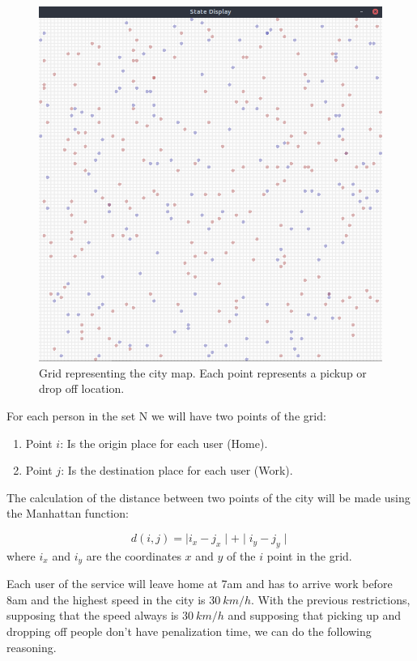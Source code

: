 \documentclass[12]{article}
\begin{document}
\begin{figure}[H]
\centering
\includegraphics[scale=0.35]{images/grid.png}
\captionsetup{justification=centering}
\caption{Grid representing the city map. Each point represents a pickup or drop off location.}
\label{grid}
\end{figure}

For each person in the set N we will have two points of the grid:

\begin{enumerate}
  \item Point $i$: Is the origin place for each user (Home).
  \item Point $j$: Is the destination place for each user (Work). 
\end{enumerate}

The calculation of the distance between two points of the city will be made using the Manhattan function: 

$$ d(i,j) = \mid i_x - j_x\mid+ \mid i_y - j_y\mid $$
where $i_x$ and $i_y$ are the coordinates $x$ and $y$ of the $i$ point in the grid. 

Each user of the service will leave home at 7am and has to arrive work before 8am and the highest speed in the city is $30\ km/h$.
With the previous restrictions, supposing that the speed always is $30\ km/h$ and supposing that picking up and dropping off people don't have penalization time, we can do the following reasoning.
\end{document}
